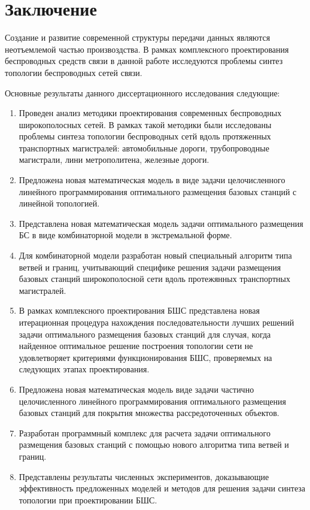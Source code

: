\chapter*{Заключение}                       %
Создание и развитие современной структуры передачи данных являются неотъемлемой частью произвоздства. В рамках комплексного проектирования беспроводных средств связи в данной работе исследуются проблемы синтез топологии беспроводных сетей связи.

Основные результаты данного диссертационного исследования следующие:

\begin{enumerate}
    \item Проведен анализ методики проектирования современных беспроводных широкополосных сетей. В рамках такой методики были исследованы проблемы синтеза топологии беспроводных сетй вдоль протяженных транспортных магистралей: автомобильные дороги, трубопроводные магистрали, лини метрополитена, железные дороги. 
    \item Предложена новая математическая модель в виде задачи целочисленного линейного программирования оптимального размещения базовых станций с линейной топологией.
    \item Представлена новая математическая модель задачи оптимального размещения БС в виде комбинаторной модели в экстремальной форме. 
    \item Для комбинаторной модели разработан новый специальный алгоритм типа ветвей и границ, учитывающий специфике решения задачи размещения базовых станций широкополосной сети вдоль протежянных транспортных магистралей.  
    
    \item В рамках комплексного проектирования БШС представлена новая итерационная процедура нахождения последовательности лучших решений задачи оптимального размещения базовых станций для случая, когда найденное оптимальное решение построения топологии сети не удовлетворяет  критериями функционирования БШС, проверяемых на следующих этапах проектирования.
    \item Предложена новая математическая модель виде задачи частично целочисленного линейного программирования оптимального размещения базовых станций для покрытия множества рассредоточенных объектов. 
    \item Разработан программный комплекс для расчета задачи оптимального размещения базовых станций с помощью нового алгоритма типа ветвей и границ.
    \item Представлены результаты численных экспериментов, доказывающие эффективность предложенных моделей и методов для решения задачи синтеза топологии при проектировании БШС.
\end{enumerate}

